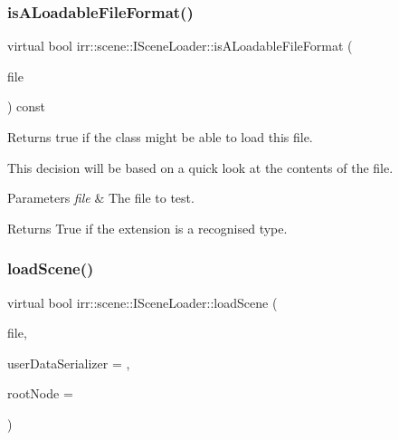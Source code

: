 \subsubsection{\texorpdfstring{is\+A\+Loadable\+File\+Format()}{isALoadableFileFormat()}}
{\footnotesize\ttfamily virtual bool irr\+::scene\+::\+I\+Scene\+Loader\+::is\+A\+Loadable\+File\+Format (\begin{DoxyParamCaption}\item[{\hyperlink{classirr_1_1io_1_1IReadFile}{io\+::\+I\+Read\+File} $\ast$}]{file }\end{DoxyParamCaption}) const\hspace{0.3cm}{\ttfamily [pure virtual]}}



Returns true if the class might be able to load this file. 

This decision will be based on a quick look at the contents of the file. 
\begin{DoxyParams}{Parameters}
{\em file} & The file to test. \\
\hline
\end{DoxyParams}
\begin{DoxyReturn}{Returns}
True if the extension is a recognised type. 
\end{DoxyReturn}
\mbox{\label{classirr_1_1scene_1_1ISceneLoader_a55282c77040a78c2b172d77bbcff8ae8}} 
\subsubsection{\texorpdfstring{load\+Scene()}{loadScene()}}
{\footnotesize\ttfamily virtual bool irr\+::scene\+::\+I\+Scene\+Loader\+::load\+Scene (\begin{DoxyParamCaption}\item[{\hyperlink{classirr_1_1io_1_1IReadFile}{io\+::\+I\+Read\+File} $\ast$}]{file,  }\item[{\hyperlink{classirr_1_1scene_1_1ISceneUserDataSerializer}{I\+Scene\+User\+Data\+Serializer} $\ast$}]{user\+Data\+Serializer = {},  }\item[{\hyperlink{classirr_1_1scene_1_1ISceneNode}{I\+Scene\+Node} $\ast$}]{root\+Node = {} }\end{DoxyParamCaption})\hspace{0.3cm}{\ttfamily [pure virtual]}}



